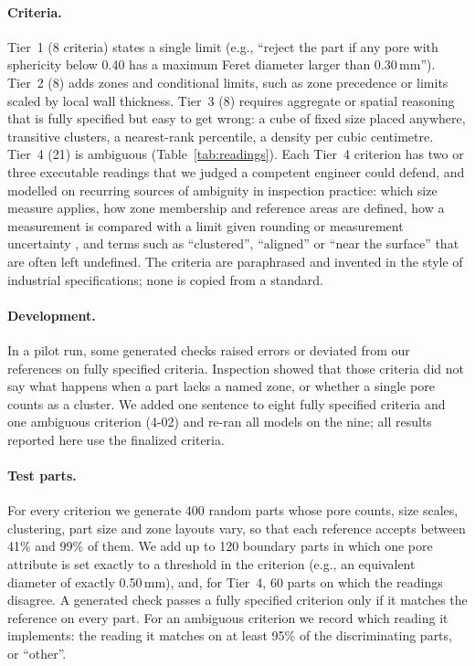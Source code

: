 \documentclass[letterpaper]{article} %
\begin{document}
\paragraph{Criteria.} Tier~1 (8 criteria) states a single limit (e.g., ``reject the part if any pore with sphericity below 0.40 has a maximum Feret diameter larger than 0.30\,mm''). Tier~2 (8) adds zones and conditional limits, such as zone precedence or limits scaled by local wall thickness. Tier~3 (8) requires aggregate or spatial reasoning that is fully specified but easy to get wrong: a cube of fixed size placed anywhere, transitive clusters, a nearest-rank percentile, a density per cubic centimetre. Tier~4 (21) is ambiguous (Table~\ref{tab:readings}). Each Tier~4 criterion has two or three executable readings that we judged a competent engineer could defend, and modelled on recurring sources of ambiguity in inspection practice: which size measure applies, how zone membership and reference areas are defined, how a measurement is compared with a limit given rounding or measurement uncertainty \cite{astm_e29,iso14253}, and terms such as ``clustered'', ``aligned'' or ``near the surface'' that are often left undefined. The criteria are paraphrased and invented in the style of industrial specifications; none is copied from a standard.

\paragraph{Development.} In a pilot run, some generated checks raised errors or deviated from our references on fully specified criteria. Inspection showed that those criteria did not say what happens when a part lacks a named zone, or whether a single pore counts as a cluster. We added one sentence to eight fully specified criteria and one ambiguous criterion (4-02) and re-ran all models on the nine; all results reported here use the finalized criteria.

\paragraph{Test parts.} For every criterion we generate 400 random parts whose pore counts, size scales, clustering, part size and zone layouts vary, so that each reference accepts between 41\% and 99\% of them. We add up to 120 boundary parts in which one pore attribute is set exactly to a threshold in the criterion (e.g., an equivalent diameter of exactly 0.50\,mm), and, for Tier~4, 60 parts on which the readings disagree. A generated check passes a fully specified criterion only if it matches the reference on every part. For an ambiguous criterion we record which reading it implements: the reading it matches on at least 95\% of the discriminating parts, or ``other''.
\end{document}
